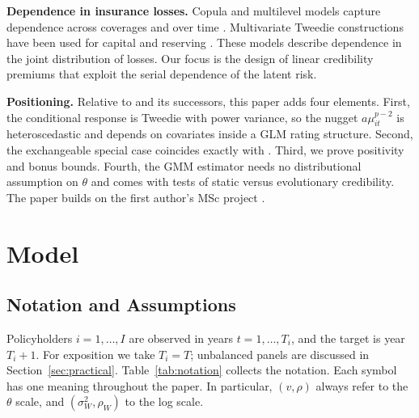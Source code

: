 \documentclass[mathematics,article,submit,moreauthors]{Definitions/mdpi}
\begin{document}
\textbf{Dependence in insurance losses.} Copula and multilevel models capture dependence across coverages and over time \citep{shi2016insurance,frees2016multivariate}. Multivariate Tweedie constructions have been used for capital and reserving \citep{furman2010multivariate,avanzi2016stochastic,alai2016multivariate}. These models describe dependence in the joint distribution of losses. Our focus is the design of linear credibility premiums that exploit the serial dependence of the latent risk.

\textbf{Positioning.} Relative to \citet{albrecht1985} and its successors, this paper adds four elements. First, the conditional response is Tweedie with power variance, so the nugget $a\mu_{it}^{p-2}$ is heteroscedastic and depends on covariates inside a GLM rating structure. Second, the exchangeable special case coincides exactly with \citet{ohlsson2006exact}. Third, we prove positivity and bonus bounds. Fourth, the GMM estimator needs no distributional assumption on $\theta$ and comes with tests of static versus evolutionary credibility. The paper builds on the first author's MSc project \citep{kang2026}.

\section{Model}\label{sec:model}

\subsection{Notation and Assumptions}

Policyholders $i=1,\dots,I$ are observed in years $t=1,\dots,T_i$, and the target is year $T_i+1$. For exposition we take $T_i=T$; unbalanced panels are discussed in Section~\ref{sec:practical}. Table~\ref{tab:notation} collects the notation. Each symbol has one meaning throughout the paper. In particular, $(v,\rho)$ always refer to the $\theta$ scale, and $(\sigma_W^2,\rho_W)$ to the log scale.
\end{document}
